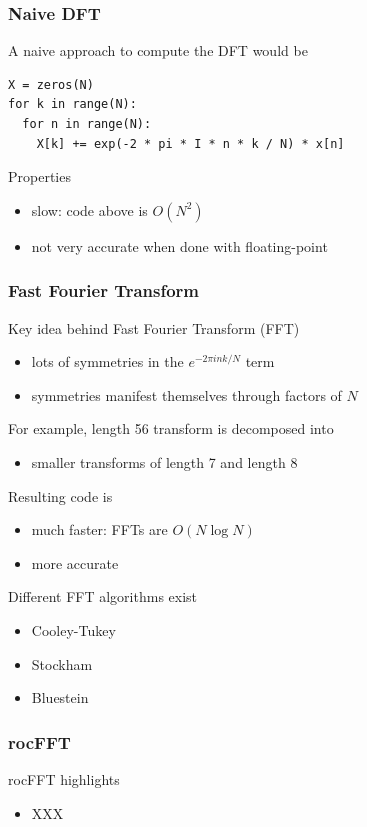 \documentclass[10pt,aspectratio=169]{beamer}
\begin{document}
\begin{frame}[fragile]
  \frametitle{Naive DFT}

  A naive approach to compute the DFT would be

\begin{verbatim}
X = zeros(N)
for k in range(N):
  for n in range(N):
    X[k] += exp(-2 * pi * I * n * k / N) * x[n]
\end{verbatim}

  Properties
  \begin{itemize}
  \item slow: code above is $O(N^2)$
  \item not very accurate when done with floating-point
  \end{itemize}
\end{frame}

\begin{frame}
  \frametitle{Fast Fourier Transform}

  Key idea behind Fast Fourier Transform (FFT)
  \begin{itemize}
  \item lots of symmetries in the $e^{-2 \pi i n k / N}$ term
  \item symmetries manifest themselves through factors of $N$
  \end{itemize}

  \medskip
  For example, length 56 transform is decomposed into
  \begin{itemize}
  \item smaller transforms of length 7 and length 8
  \end{itemize}

  \medskip
  Resulting code is
  \begin{itemize}
  \item much faster: FFTs are $O(N \log N)$
  \item more accurate
  \end{itemize}

  \medskip
  Different FFT algorithms exist
  \begin{itemize}
  \item Cooley-Tukey
  \item Stockham
  \item Bluestein
  \end{itemize}
\end{frame}

\begin{frame}
  \frametitle{rocFFT}

  rocFFT highlights
  \begin{itemize}
  \item XXX
  \end{itemize}
\end{frame}
\end{document}
